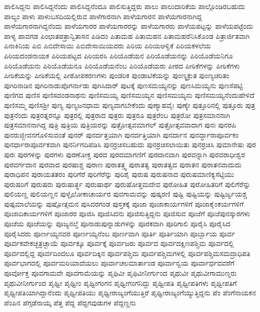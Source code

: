 {ಪಾಲಿಸಿದ್ದನು
ಪಾಲಿಸಿದ್ದನೆಂದು
ಪಾಲಿಸಿದ್ದನೆಂದೂ
ಪಾಲಿಸುತ್ತಿದ್ದರು
ಪಾಲು
ಪಾಲುದಾರಿಕೆಯ
ಪಾಲ್ಗೊಂಡಿರಬಹುದು
ಪಾಲ್ಯಂ
ಪಾಳು
ಪಾಳುಬಸದಿಯಲ್ಲಿರುವ
ಪಾಳೆಗಾರನಾಗಿ
ಪಾಳೆಯಗಾರನ
ಪಾಳೆಯಗಾರನಾಗಿದ್ದ
ಪಾಳೆಯಗಾರನಾಗಿದ್ದನೆಂದು
ಪಾಳೆಯಗಾರರ
ಪಾಳೆಯಗಾರರನ್ನು
ಪಾಳೆಯಗಾರರು
ಪಾಳೆಯಪಟ್ಟನ್ನು
ಪಾಳೆಯಪಟ್ಟೆಂದು
ಪಾಳ್ಯ
ಪಾವಗಡ
ಪಿಂಛಾತಪತ್ರಾನ್ವಿತಾಸನ
ಪಿಡಿದಂ
ಪಿತಾಮಹ
ಪಿತಾಮಹನ
ಪಿತಾಮಹರೆನಿಸಿಕೊಂಡ
ಪಿತ್ರಾರ್ಜಿತವಾಗಿ
ಪಿನಾಕಿನಿಯ
ಪಿಬಿ
ಪಿಬಿದೇಸಾಯಿ
ಪಿಬಿದೇಸಾಯಿಯವರು
ಪಿರಿಯ
ಪಿರಿಯಆಳ್ವಿಕೆ
ಪಿರಿಯಕಳಲೆಯ
ಪಿರಿಯದಂಡನಾಯಕ
ಪಿರಿಯಪಟ್ಟದ
ಪಿರಿಯರಸಿ
ಪಿರಿಯೊಡೆಯನ
ಪಿರಿಯೊಡೆಯನನ್ನು
ಪಿರಿಯೊಡೆಯನಿಗೂ
ಪಿರಿಯೊಡೆಯನು
ಪಿರಿಯೊಡೆಯನೂ
ಪಿರಿಯೊಡೆಯನೆಂಬ
ಪಿರಿಯೊಡೆಯರು
ಪೀಠದ
ಪೀಠಿಕೆಗಳನ್ನು
ಪೀಠಿಕೆಗಳು
ಪೀಠಿಕೆಯನ್ನು
ಪೀಠಿಕೆಯಲ್ಲಿ
ಪೀಠೋಪಕರಣಗಳು
ಪುಂಡರಿಕ
ಪುಂಡಾಟಿಕೆಯನ್ನು
ಪುಂಣ್ಯಕ್ರುತ
ಪುಂಣ್ಯಚರಿತಂ
ಪುಗಿರಿನಾಡಿನ
ಪುಗಿರಿನಾಡುಪೊಗರ್ನಾಡು
ಪುಗಿಸಿದಾರ್
ಪುಟಕ್ಕೆ
ಪುಣಸಮಯ್ಯನನ್ನು
ಪುಣಸಿಮಯ್ಯನು
ಪುಣಸೆಪಟ್ಟಿ
ಪುಣಿಗದ
ಪುಣಿಸ
ಪುಣಿಸದಂಡನಾಥನು
ಪುಣಿಸಮಯ್ಯ
ಪುಣಿಸಮಯ್ಯನ
ಪುಣಿಸಮಯ್ಯನು
ಪುಣಿಸಮಯ್ಯನೆಂದುಹೇಳಿದೆ
ಪುಣಿಸಮ್ಮ
ಪುಣಿಸಶ್ರೀ
ಪುಣ್ಯ
ಪುಣ್ಯಜನಧಾಮ
ಪುಣ್ಯವಾಗಬೇಕೆಂದು
ಪುಣ್ಯಾಹವೈಃ
ಪುಣ್ಯೇ
ಪುತ್ತೂರಿನಲ್ಲಿ
ಪುತ್ತೂರು
ಪುತ್ರ
ಪುತ್ರನೆಂದು
ಪುತ್ರರತ್ನರನ್ನೂ
ಪುತ್ರರಲ್ಲಿ
ಪುತ್ರರಾದ
ಪುತ್ರರು
ಪುತ್ರರೂ
ಪುತ್ರರೆಂಬ
ಪುತ್ರರೋ
ಪುತ್ರಸಮಾನನಾಗಿ
ಪುತ್ರಸಮಾನನಾಗಿದ್ದ
ಪುತ್ರಿ
ಪುತ್ರಿಯ
ಪುತ್ರಿಯರನ್ನು
ಪುತ್ರೋತ್ಸವಮಾಗಲ್
ಪುತ್ರೋತ್ಸವವಾದಾಗ
ಪುನಃ
ಪುನರಪಿ
ಪುನರುಜ್ಜೀವನಗೊಳಿಸುವಂತೆ
ಪುನರ್
ಪುನರ್ದತ್ತಯಾಗಿ
ಪುನರ್ದತ್ತಿಯಾಗಿ
ಪುನರ್ದಾನ
ಪುನರ್ದ್ಧಾರಾಪೂರ್ವಕಂ
ಪುನರ್ಧಾರಾಪೂರ್ವಕವಾಗಿ
ಪುನರ್ನಿಗದಿಪಡಿಸಿ
ಪುನರ್ರಚಿಸಬಹುದು
ಪುನರ್ರಚಿಸಲಾಯಿತು
ಪುನರ್ರಚಿಸಿ
ಪುಮಾನೇಷಃ
ಪುರ
ಪುರಃ
ಪುರಗಳನ್ನು
ಪುರಗಳು
ಪುರಣೋಕ್ತ
ಪುರದ
ಪುರದಮಾಗಣಿಗೆ
ಪುರದಾನವಾಗಿ
ಪುರವನ್ನಾಗಿ
ಪುರವರಾಧೀಶ್ವರ
ಪುರವರ್ಗದಾನ
ಪುರವಾದ
ಪುರಷಾಶ್ಚ
ಪುರಾಣ
ಪುರಾತತ್ತ್ವ
ಪುರಾತತ್ವ
ಪುರಾತತ್ವದ
ಪುರಾತನ
ಪುರಾತನವಾದುದು
ಪುರಾಧಿಪನ
ಪುರಾಯತತರಂ
ಪುರಿಗೆರೆ
ಪುರಿಗೆರೆನ್ನು
ಪುರಿಶೈ
ಪುರುಷ
ಪುರುಷನಾದ
ಪುರುಷಮಾಣಿಕ್ಯಸೆಟ್ಟಿಯು
ಪುರುಷರಿಗೆ
ಪುರುಷರು
ಪುರುಷಾರ್ತ್ಥ
ಪುರುಷಾರ್ಥ
ಪುರುಷೋತ್ತಮದೇವ
ಪುರೋಹಿತ
ಪುರೋಹಿತರಿಗೆ
ಪುಲಿಗೆರೆನ್ನು
ಪುಲಿಯಣ್ಣ
ಪುಲಿಯಣ್ಣನ
ಪುಳ್ಳೈಲೋಕಾಚಾರ್ಯರ
ಪುವಗಾಮವನ್ನು
ಪುಷ್ಕರಣಿ
ಪುಷ್ಟಿ
ಪುಷ್ಟಿಯನ್ನು
ಪುಷ್ಟಿರ್ಜ್ವಯಶ್ಚ
ಪುಷ್ಪಮಾಲೆಯನ್ನು
ಪುಷ್ಪೋತ್ಗಮನ
ಪುಸಿವರಗಂಡ
ಪುಸ್ತಕಕ್ಕೆ
ಪೂಜಾ
ಪೂಜಾಕಾರ್ಯಗಳಿಗೆ
ಪೂಜಾಕೈಂಕರ್ಯಗಳಿಗೆ
ಪೂಜಾದಿಕಾರ್ಯಗಳಿಗೆ
ಪೂಜಾರರ
ಪೂಜಿಸಿ
ಪೂಜಿಸಿದನು
ಪೂಜಿಸುತ್ತಿದ್ದನು
ಪೂಜಿಸುವ
ಪೂಜೆಗೆ
ಪೂಜೆಪುನಸ್ಕಾರಗಳು
ಪೂಜೆಯ
ಪೂಜೆಯನ್ನು
ಪೂಜ್ಯನಲ್ತೆ
ಪೂನಾಡುಪುನ್ನಾಡುಗಳನ್ನು
ಪೂರಕವಾಗಿ
ಪೂರಿಗಾಲಿ
ಪೂರೈಸಿ
ಪೂರೈಸಿದ
ಪೂರೈಸಿದರು
ಪೂರ್ಣಯ್ಯನವರ
ಪೂರ್ಣಯ್ಯನೆಂಬ
ಪೂರ್ಣವಾಗಿ
ಪೂರ್ತಿ
ಪೂರ್ತಿಯಾಗಿ
ಪೂರ್ಬ್ಬಾಯ
ಪೂರ್ವ
ಪೂರ್ವಕವೇಕಚ್ಛತ್ರಚ್ಛಾಯೆ
ಪೂರ್ವಕ್ಕೂ
ಪೂರ್ವಕ್ಕೆ
ಪೂರ್ವಜರು
ಪೂರ್ವದ
ಪೂರ್ವದಕ್ಷಿಣಪಶ್ಚಿಮ
ಪೂರ್ವದಲ್ಲಿ
ಪೂರ್ವದಲ್ಲಿದ್ದ
ಪೂರ್ವದಿಂದಲೂ
ಪೂರ್ವದಿಕ್ಕಿನ
ಪೂರ್ವಪಶ್ಚಿಮ
ಪೂರ್ವಪಶ್ಚಿಮಗಳಲ್ಲಿ
ಪೂರ್ವಪಶ್ಚಿಮಸಮದ್ರಾಧಿಪತಿ
ಪೂರ್ವಭಾಗದಲ್ಲಿ
ಪೂರ್ವಮರಿಯಾದೆಯಲು
ಪೂರ್ವಾಚಲಮಾರ್ತಾಂಡ
ಪೂರ್ವಾನ್ವಯ
ಪೂರ್ವಾರ್ಧದವರೆಗೆ
ಪೂರ್ವೋಕ್ತ
ಪೂವಗಾಮವೇ
ಪೂವಗಾಮೆಯನ್ನು
ಪೃಥಿವೀ
ಪೃಥಿವೀನೀರ್ಗುಂದ
ಪೃಥುವೀ
ಪೃಥುವೀಗಾಮುಣ್ಡರು
ಪೃಥುವೀನೀರ್ಗುಂದ
ಪೃಥ್ವೀ
ಪೃಥ್ವೀಂ
ಪೃಥ್ವೀಗಂಗನ
ಪೃಥ್ವೀಗಂಗನಿದ್ದು
ಪೃಥ್ವೀಪತಿ
ಪೃಥ್ವೀಪತಿಗಳು
ಪೃಥ್ವೀಪತಿಗೆ
ಪೃಥ್ವೀಪತಿಯಾಗಿದ್ದಾನೆಂದು
ಪೃಥ್ವೀಪತಿಯು
ಪೃಥ್ವೀರಾಜ್ಯಂಗೆಯುತ್ತಿರೆ
ಪೃಥ್ವೀರಾಜ್ಯಂಗೆಯ್ಯುತ್ತಿದ್ದನು
ಪೆಂ
ಪೆಂಗೆನಾಯಕನ
ಪೆಂಪಿನ
ಪೆಗ್ಗಡೆನಾಯ್ಕ
ಪೆತ್ತ
ಪೆದ್ದ
ಪೆದ್ದಗವುಡುಗಳ
ಪೆದ್ದಣ್ಣನು
}
